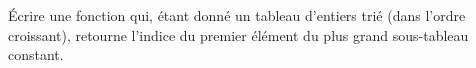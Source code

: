 Écrire une fonction qui, étant donné un tableau d'entiers trié (dans l'ordre
croissant), retourne l'indice du premier élément du plus grand sous-tableau
constant.